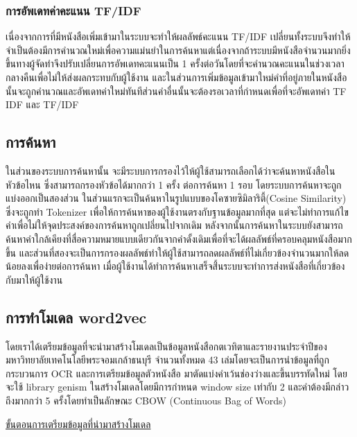 \subsubsection{การอัพเดทค่าคะแนน TF/IDF}

เนื่องจากการที่มีหนังสือเพิ่มเข้ามาในระบบจะทำให้ผลลัพธ์คะแนน TF/IDF เปลี่ยนทั้งระบบจึงทำให้จำเป็นต้องมีการคำนวณใหม่เพื่อความแม่นยำในการค้นหาแต่เนื่องจากถ้าระบบมีหนังสือจำนวนมากยิ่งขึ้นทางผู้จัดทำจึงปรับเปลี่ยนการอัพเดทคะแนนเป็น 1 ครั้งต่อวันโดยที่จะคำนวณคะแนนในช่วงเวลากลางคืนเพื่อไม่ให้ส่งผลกระทบกับผู้ใช้งาน และในส่วนการเพิ่มข้อมูลเข้ามาใหม่คำที่อยู่ภายในหนังสือนั้นจะถูกคำนวณและอัพเดทค่าใหม่ทันทีส่วนคำอื่นนั้นจะต้องรอเวลาที่กำหนดเพื่อที่จะอัพเดทค่า TF IDF และ TF/IDF 

\subsection{การค้นหา}

ในส่วนของระบบการค้นหานั้น จะมีระบบการกรองไว้ให้ผู้ใช้สามารถเลือกได้ว่าจะค้นหาหนังสือในหัวข้อไหน ซึ่งสามารถกรองหัวข้อได้มากกว่า 1 ครั้ง ต่อการค้นหา 1 รอบ โดยระบบการค้นหาจะถูกแบ่งออกเป็นสองส่วน ในส่วนแรกจะเป็นค้นหาในรูปแบบของโคซายซิมิลาริตี้(Cosine Similarity) ซึ่งจะถูกทำ  Tokenizer เพื่อให้การค้นหาของผู้ใช้งานตรงกับฐานข้อมูลมากที่สุด แต่จะไม่ทำการแก้ไขคำเพื่อไม่ให้จุดประสงค์ของการค้นหาถูกเปลี่ยนไปจากเดิม หลังจากนั้นการค้นหาในระบบยังสามารถค้นหาคำใกล้เคียงที่สื่อความหมายแบบเดียวกันจากคำดั้งเดิมเพื่อที่จะได้ผลลัพธ์ที่ครอบคลุมหนังสือมากขึ้น และส่วนที่สองจะเป็นการกรองผลลัพธ์ทำให้ผู้ใช้สามารถลดผลลัพธ์ที่ไม่เกี่ยวข้องจำนวนมากให้ลดน้อยลงเพื่อง่ายต่อการค้นหา เมื่อผู้ใช้งานได้ทำการค้นหาเสร็จสิ้่นระบบจะทำการส่งหนังสือที่เกี่ยวข้องกับมาให้ผู้ใช้งาน

\subsection{การทำโมเดล word2vec}

โดยเราได้เตรียมข้อมูลที่จะนำมาสร้างโมเดลเป็นข้อมูลหนังสือกตเวทิตาและรายงานประจำปีของมหาวิทยาลัยเทคโนโลยีพระจอมเกล้าธนบุรี จำนวนทั้งหมด 43 เล่มโดยจะเป็นการนำข้อมูลที่ถูกกระบวนการ OCR และการเตรียมข้อมูลตัวหนังสือ มาตัดแบ่งคำเว้นช่องว่างและขึ้นบรรทัดใหม่ โดยจะใช้ library genism ในสร้างโมเดลโดยมีการกำหนด window size เท่ากับ 2 และคำต้องมีกล่าวถึงมากกว่า 5 ครั้งโดยทำเป็นลักษณะ CBOW (Continuous Bag of Words)

\underline{ขั้นตอนการเตรียมข้อมูลที่นำมาสร้างโมเดล}

